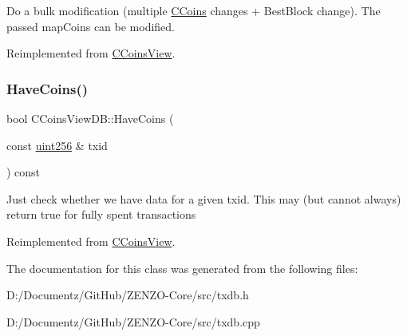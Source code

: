 Do a bulk modification (multiple \mbox{\hyperlink{class_c_coins}{C\+Coins}} changes + Best\+Block change). The passed map\+Coins can be modified. 

Reimplemented from \mbox{\hyperlink{class_c_coins_view_ad7dc37396ca4fac7014cea06fec7178e}{C\+Coins\+View}}.

\mbox{\label{class_c_coins_view_d_b_af55f35faadeb74b5406559fe3ed20114}} 
\subsubsection{\texorpdfstring{HaveCoins()}{HaveCoins()}}
{\footnotesize\ttfamily bool C\+Coins\+View\+D\+B\+::\+Have\+Coins (\begin{DoxyParamCaption}\item[{const \mbox{\hyperlink{classuint256}{uint256}} \&}]{txid }\end{DoxyParamCaption}) const\hspace{0.3cm}{\ttfamily [virtual]}}

Just check whether we have data for a given txid. This may (but cannot always) return true for fully spent transactions 

Reimplemented from \mbox{\hyperlink{class_c_coins_view_ade3a65fc3f1b02baf7bebce630e4eba3}{C\+Coins\+View}}.



The documentation for this class was generated from the following files\+:\begin{DoxyCompactItemize}
\item 
D\+:/\+Documentz/\+Git\+Hub/\+Z\+E\+N\+Z\+O-\/\+Core/src/txdb.\+h\item 
D\+:/\+Documentz/\+Git\+Hub/\+Z\+E\+N\+Z\+O-\/\+Core/src/txdb.\+cpp\end{DoxyCompactItemize}
